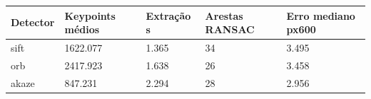 \begin{tabular}{lllll}
\hline
Detector & Keypoints médios & Extração s & Arestas RANSAC & Erro mediano px600 \\ \hline
sift & 1622.077 & 1.365 & 34 & 3.495 \\
orb & 2417.923 & 1.638 & 26 & 3.458 \\
akaze & 847.231 & 2.294 & 28 & 2.956 \\
\hline
\end{tabular}

